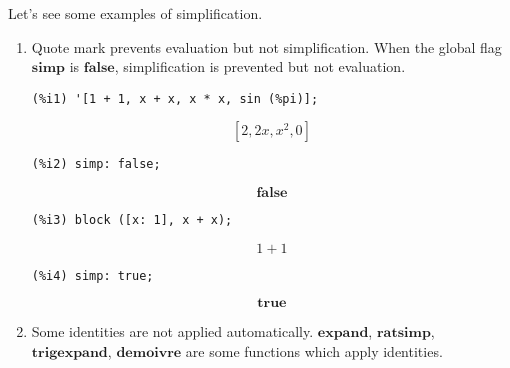\documentclass[12pt,leqno]{article}
\begin{document}
Let's see some examples of simplification.

\begin{enumerate}

\item Quote mark prevents evaluation but not simplification.
When the global flag $\mathbf{simp}$ is $\mathbf{false}$,
simplification is prevented but not evaluation.

\begin{verbatim}
(%i1) '[1 + 1, x + x, x * x, sin (%pi)];
\end{verbatim}
\begin{dmath}[number={\(\mathop{\mathrm{\%o}_{1}}\)}]
\left[2, 2 x, {x}^{2}, 0\right]
\end{dmath}
\begin{verbatim}
(%i2) simp: false;
\end{verbatim}
\begin{dmath}[number={\(\mathop{\mathrm{\%o}_{2}}\)}]
\mathop{\mathbf{false}}
\end{dmath}
\begin{verbatim}
(%i3) block ([x: 1], x + x);
\end{verbatim}
\begin{dmath}[number={\(\mathop{\mathrm{\%o}_{3}}\)}]
1+1
\end{dmath}
\begin{verbatim}
(%i4) simp: true;
\end{verbatim}
\begin{dmath}[number={\(\mathop{\mathrm{\%o}_{4}}\)}]
\mathop{\mathbf{true}}
\end{dmath}


\item Some identities are not applied automatically.
$\mathbf{expand}$, $\mathbf{ratsimp}$, $\mathbf{trigexpand}$, $\mathbf{demoivre}$
are some functions which apply identities.


\end{enumerate}
\end{document}
